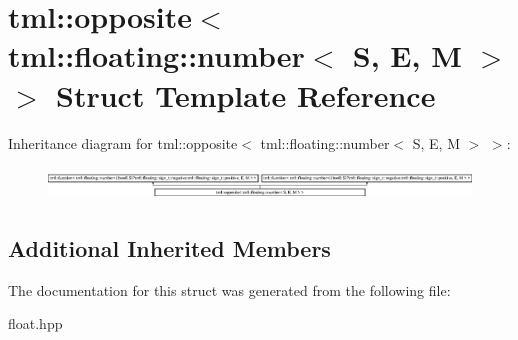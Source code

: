 \hypertarget{structtml_1_1opposite_3_01tml_1_1floating_1_1number_3_01S_00_01E_00_01M_01_4_01_4}{\section{tml\+:\+:opposite$<$ tml\+:\+:floating\+:\+:number$<$ S, E, M $>$ $>$ Struct Template Reference}
\label{structtml_1_1opposite_3_01tml_1_1floating_1_1number_3_01S_00_01E_00_01M_01_4_01_4}
}
Inheritance diagram for tml\+:\+:opposite$<$ tml\+:\+:floating\+:\+:number$<$ S, E, M $>$ $>$\+:\begin{figure}[H]
\begin{center}
\leavevmode
\includegraphics[height=0.869565cm]{structtml_1_1opposite_3_01tml_1_1floating_1_1number_3_01S_00_01E_00_01M_01_4_01_4}
\end{center}
\end{figure}
\subsection*{Additional Inherited Members}


The documentation for this struct was generated from the following file\+:\begin{DoxyCompactItemize}
\item 
float.\+hpp\end{DoxyCompactItemize}
